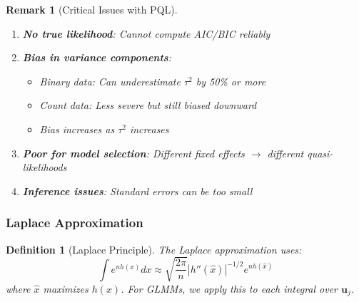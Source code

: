 \documentclass{article}
\newtheorem{definition}{Definition}
\newtheorem{remark}{Remark}
\begin{document}
\begin{remark}[Critical Issues with PQL]
\begin{enumerate}
    \item \textbf{No true likelihood}: Cannot compute AIC/BIC reliably
    \item \textbf{Bias in variance components}:
    \begin{itemize}
        \item Binary data: Can underestimate $\tau^2$ by 50\% or more
        \item Count data: Less severe but still biased downward
        \item Bias increases as $\tau^2$ increases
    \end{itemize}
    \item \textbf{Poor for model selection}: Different fixed effects $\rightarrow$ different quasi-likelihoods
    \item \textbf{Inference issues}: Standard errors can be too small
\end{enumerate}
\end{remark}

\subsubsection{Laplace Approximation}

\begin{definition}[Laplace Principle]
The Laplace approximation uses:
\begin{equation}
\int e^{n h(x)} dx \approx \sqrt{\frac{2\pi}{n}} |h''(\hat{x})|^{-1/2} e^{n h(\hat{x})}
\end{equation}
where $\hat{x}$ maximizes $h(x)$. For GLMMs, we apply this to each integral over $\mathbf{u}_j$.
\end{definition}
\end{document}
